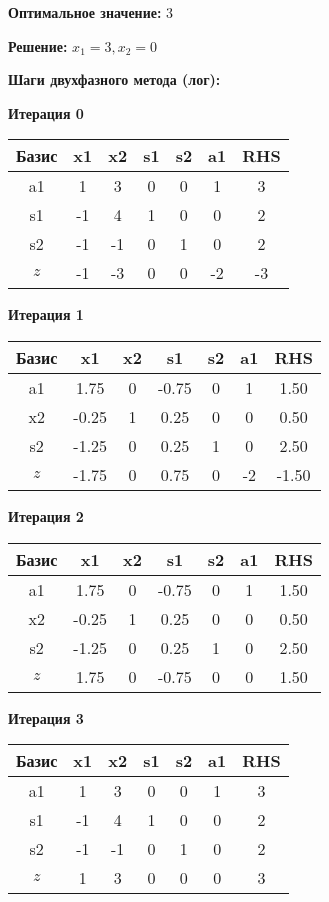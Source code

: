 \documentclass[a4paper,12pt]{article}
\begin{document}
\textbf{Оптимальное значение: }$3$

\textbf{Решение: }$x_{1}=3, x_{2}=0$

\textbf{Шаги двухфазного метода (лог):}


 \textbf{Итерация 0}\\
\begin{tabular}{|c|c|c|c|c|c|c|}
\hline
Базис & x1 & x2 & s1 & s2 & a1 & RHS \\ \hline
a1 & 1 & 3 & 0 & 0 & 1 & 3 \\ \hline
s1 & -1 & 4 & 1 & 0 & 0 & 2 \\ \hline
s2 & -1 & -1 & 0 & 1 & 0 & 2 \\ \hline
$z$ & -1 & -3 & 0 & 0 & -2 & -3 \\ \hline
\end{tabular}
\vspace{5mm}

 \textbf{Итерация 1}\\
\begin{tabular}{|c|c|c|c|c|c|c|}
\hline
Базис & x1 & x2 & s1 & s2 & a1 & RHS \\ \hline
a1 & 1.75 & 0 & -0.75 & 0 & 1 & 1.50 \\ \hline
x2 & -0.25 & 1 & 0.25 & 0 & 0 & 0.50 \\ \hline
s2 & -1.25 & 0 & 0.25 & 1 & 0 & 2.50 \\ \hline
$z$ & -1.75 & 0 & 0.75 & 0 & -2 & -1.50 \\ \hline
\end{tabular}
\vspace{5mm}

 \textbf{Итерация 2}\\
\begin{tabular}{|c|c|c|c|c|c|c|}
\hline
Базис & x1 & x2 & s1 & s2 & a1 & RHS \\ \hline
a1 & 1.75 & 0 & -0.75 & 0 & 1 & 1.50 \\ \hline
x2 & -0.25 & 1 & 0.25 & 0 & 0 & 0.50 \\ \hline
s2 & -1.25 & 0 & 0.25 & 1 & 0 & 2.50 \\ \hline
$z$ & 1.75 & 0 & -0.75 & 0 & 0 & 1.50 \\ \hline
\end{tabular}
\vspace{5mm}

 \textbf{Итерация 3}\\
\begin{tabular}{|c|c|c|c|c|c|c|}
\hline
Базис & x1 & x2 & s1 & s2 & a1 & RHS \\ \hline
a1 & 1 & 3 & 0 & 0 & 1 & 3 \\ \hline
s1 & -1 & 4 & 1 & 0 & 0 & 2 \\ \hline
s2 & -1 & -1 & 0 & 1 & 0 & 2 \\ \hline
$z$ & 1 & 3 & 0 & 0 & 0 & 3 \\ \hline
\end{tabular}
\vspace{5mm}
\end{document}
